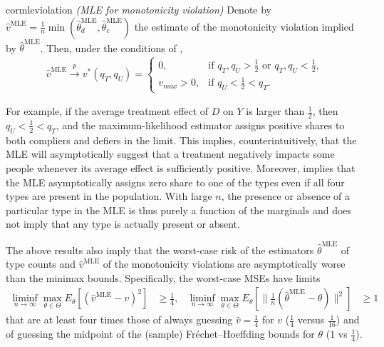 \documentclass[12pt,reqno]{amsart}
\begin{document}
\begin{restatable}{cor}{mleviolation}
\label{cor:mleviolation}
\emph{(MLE for monotonicity violation)}
Denote by $\hat{v}^{\text{MLE}} = \tfrac{1}{n}\min(\hat{\theta}^{\text{MLE}}_d, \hat{\theta}^{\text{MLE}}_c)$ the estimate of the monotonicity violation implied by $\hat{\theta}^{\text{MLE}}$.
Then, under the conditions of ,
\begin{align*}
    \hat{v}^{\text{MLE}} \xrightarrow{p} v^*(q_T,q_U)
    =
    \begin{cases}
        0, & \text{if } q_T, q_U > \tfrac{1}{2} \text{ or } q_T, q_U < \tfrac{1}{2}, \\
        v_{max} > 0, & \text{if } q_U < \tfrac{1}{2} < q_T.
    \end{cases}
\end{align*}

\end{restatable}

For example, 
if the average treatment effect of $D$ on $Y$ is larger than $\tfrac{1}{2}$, then $q_U < \tfrac{1}{2} < q_T$, and the maximum-likelihood estimator assigns positive shares to both compliers and defiers in the limit.
This implies, counterintuitively, that the MLE will asymptotically suggest that a treatment negatively impacts some people whenever its average effect is sufficiently positive.
Moreover,  implies that the MLE asymptotically assigns zero share to one of the types even if all four types are present in the population. With large $n$, the presence or absence of a particular type in the MLE is thus purely a function of the marginals and does not imply that any type is actually present or absent. 


The above results also imply that the worst-case risk of the estimators $\hat{\theta}^{\text{MLE}}$ of type counts and $\hat{v}^{\text{MLE}}$ of the monotonicity violations are asymptotically worse than the minimax bounds.
Specifically, the worst-case MSEs have limits
\begin{align*}
    \liminf_{n\to\infty}\max_{\theta \in \Theta} E_\theta\left[(\hat{v}^{\text{MLE}} -
    v)^2\right] &\ge \tfrac{1}{4},
    &
    \liminf_{n\to\infty}\max_{\theta \in \Theta} E_\theta\left[\big\|\tfrac{1}{n}(\hat{\theta}^{\text{MLE}} -
    \theta)\big\|^2\right] &\ge 1
\end{align*}
that are at least four times those of
always guessing $\hat{v} = \tfrac{1}{4}$ for $v$ ($\tfrac{1}{4}$ versus $\tfrac{1}{16}$)
and of
guessing the midpoint of the (sample) Fr\'echet--Hoeffding bounds for $\theta$ ($1$ vs $\tfrac{1}{4}$).
\end{document}
